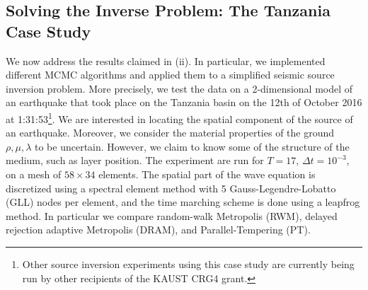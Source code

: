 \subsection{Solving the Inverse Problem: The Tanzania Case Study}
We now address the results claimed in (ii). In particular, we implemented different MCMC algorithms and applied them to a simplified seismic source inversion problem. More precisely, we test the data on a  2-dimensional model of an earthquake that took place on the Tanzania basin on the 12th of October 2016 at 1:31:53\footnote{Other source inversion experiments using this case study are currently being run by other recipients of the KAUST CRG4 grant.}. We are interested in locating the spatial component of the source of an earthquake. Moreover, we consider the material properties of the ground $\rho,\mu,\lambda$ to be uncertain. However, we claim to know some of the structure of the medium, such as layer position. The experiment are run for $T=17$, $\Delta t=10^{-3}$, on a mesh of $58\times34$ elements. The spatial part of the wave equation is discretized using a spectral element method with 5 Gauss-Legendre-Lobatto (GLL) nodes per element, and the time marching scheme is done using a leapfrog method.  In particular we compare random-walk Metropolis (RWM), delayed rejection adaptive Metropolis (DRAM),  and Parallel-Tempering (PT).
